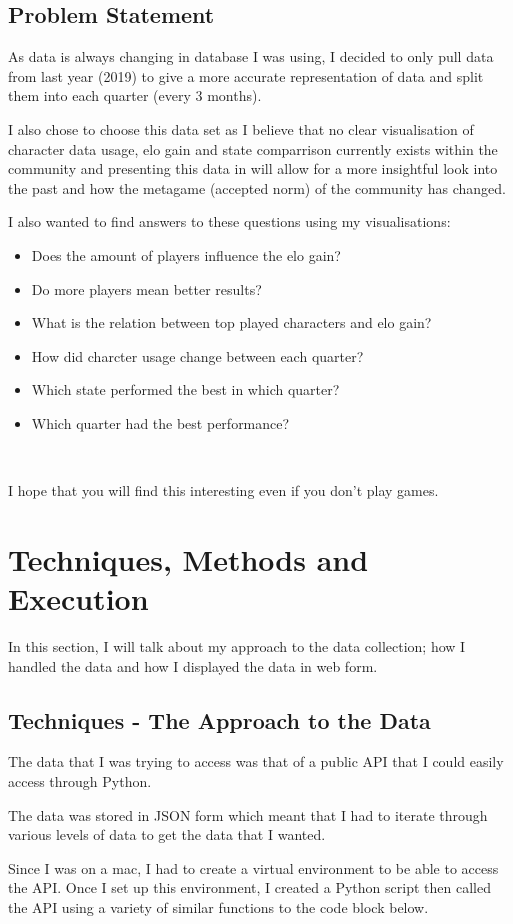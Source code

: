 \documentclass[11pt, oneside, a4paper]{article}
\begin{document}
\subsection{Problem Statement}
As data is always changing in database I was using, I decided to only pull data from last year (2019) to give a more accurate representation of data and split them into each quarter (every 3 months). 

I also chose to choose this data set as I believe that no clear visualisation of character data usage, elo gain and state comparrison currently exists within the community and presenting this data in will allow for a more insightful look into the past and how the metagame (accepted norm) of the community has changed. 

I also wanted to find answers to these questions using my visualisations:
\begin{itemize}
    \item Does the amount of players influence the elo gain?
    \item Do more players mean better results?
    \item What is the relation between top played characters and elo gain?
    \item How did charcter usage change between each quarter?
    \item Which state performed the best in which quarter?
    \item Which quarter had the best performance?
\end{itemize}
\

I hope that you will find this interesting even if you don't play games.

\section{Techniques, Methods and Execution}
In this section, I will talk about my approach to the data collection; how I handled the data and how I displayed the data in web form.
\subsection{Techniques - The Approach to the Data}
The data that I was trying to access was that of a public API that I could easily access through Python. 

The data was stored in JSON form which meant that I had to iterate through various levels of data to get the data that I wanted. 

Since I was on a mac, I had to create a virtual environment to be able to access the API. Once I set up this environment, I created a Python script then called the API using a variety of similar functions to the code block below.
\end{document}
